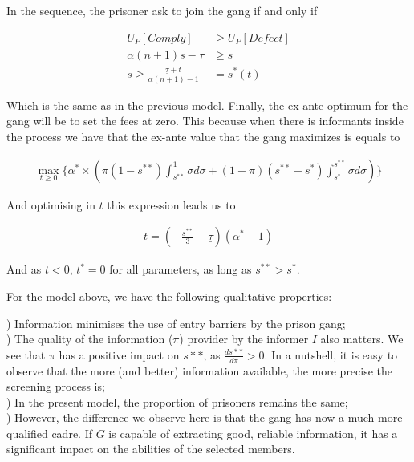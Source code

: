 In the sequence, the prisoner ask to join the gang if and only if

\begin{equation}
\begin{split}
U_P[Comply] &\geq U_P[Defect]\\
\alpha (n + 1) s - \tau &\geq s \\
s \geq \frac{\underline{\tau}+t}{\alpha (n+1) - 1} &= s^*(t)
\end{split}
\end{equation}

Which is the same as in the previous model. Finally, the ex-ante optimum for the gang will be to set the fees at zero. This because when there is informants inside the process we have that the ex-ante value that the gang maximizes is equals to 

\begin{equation}
\begin{split}
\max_{t \geq 0} \{ \alpha^* \times (\pi(1-s^{**})\int_{s^{**}}^1 \sigma d\sigma + (1-\pi)(s^{**}-s^{*})\int_{s^{*}}^{s^{**}} \sigma d\sigma ) \}
\end{split}
\end{equation}

And optimising in $t$ this expression leads us to 

\begin{align}
t = \left(-\frac{s^{**}}{3} - \underline{\tau} \right) (\alpha^*-1)
\end{align}

And as $t<0$, $t^*=0$ for all parameters, as long as $s^{**}>s^*$.

For the model above, we have the following qualitative properties:

) Information minimises the use of entry barriers by the prison gang;\\

) The quality of the information ($\pi$) provider by the informer $I$ also matters. We see that $\pi$ has a positive impact on $s**$, as $\frac{ds**}{d\pi} > 0$. In a nutshell, it is easy to observe that the more (and better) information available, the more precise the screening process is;\\

) In the present model, the proportion of prisoners remains the same;\\

) However, the difference we observe here is that the gang has now a much more qualified cadre. If $G$ is capable of extracting good, reliable information, it has a significant impact on the abilities of the selected members.

